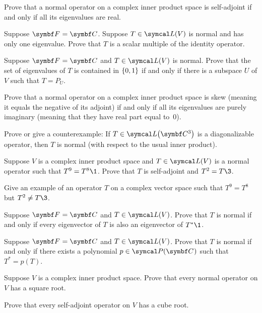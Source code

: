 \begin{exercises}

\exercise
Prove that a normal operator on a complex inner product space is self-adjoint if and only if all its eigenvalues are real.\label{7normalreal}


\exercise
Suppose $\F{} = \C{}$. Suppose $T \in \L(V)$ is normal and has only one eigenvalue. Prove that $T$ is a scalar multiple of the identity operator.


\exercise
Suppose $\F{} = \C{}$ and $T \in \L(V)$ is normal. Prove that the set of eigenvalues of $T$ is contained in $\{0, 1\}$ if and only if there is a subspace $U$ of $V$ such that $T = P_{\!U}$.


\exercise
Prove that a normal operator on a complex inner product space is skew (meaning it equals the negative of its adjoint) if and only if all its eigenvalues are purely imaginary (meaning that they have real part equal to~$0$).


\exercise
Prove or give a counterexample:  If $T \in \L\paren[\big]{\C{3}}$ is a diagonalizable operator, then $T$ is normal (with respect to the usual inner product).


\exercise
Suppose $V$ is a complex inner product space and $T \in \L(V)$ is a normal
operator such that $T^9 = T^8\1$.  Prove that $T$ is self-adjoint and $T^2 =T\3$.


\exercise
Give an example of an operator $T$ on a complex vector space
such that $T^9 = T^8$ but $T^2 \ne T\3$.


\exercise
Suppose $\F{} = \C{}$ and $T \in \L(V)$. Prove that $T$ is normal if and only if every eigenvector of $T$ is also an eigenvector of $T^*\1$.


\exercise
Suppose $\F{} = \C{}$ and $T \in \L(V)$. Prove that $T$ is normal if and only if there exists a polynomial $p \in \P(\C{})$ such that
$T^* = p(T)$.\label{4pnormal}


\exercise
Suppose $V$ is a complex inner product space.  Prove that every normal
operator on $V$ has a square root.


\exercise
Prove that every self-adjoint operator on $V$ has a cube root.



\end{exercises}
